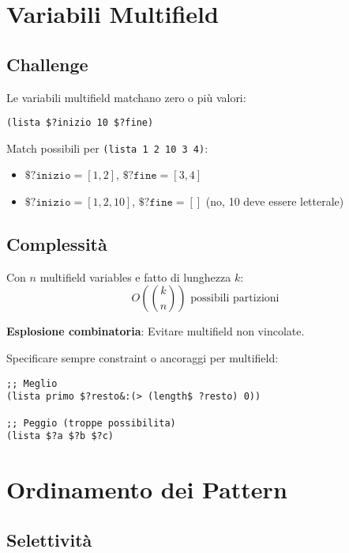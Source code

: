 \section{Variabili Multifield}

\subsection{Challenge}

Le variabili multifield matchano zero o più valori:

\begin{lstlisting}[language=CLIPS]
(lista $?inizio 10 $?fine)
\end{lstlisting}

Match possibili per \texttt{(lista 1 2 10 3 4)}:
\begin{itemize}
\item $\texttt{\$?inizio} = [1,2]$, $\texttt{\$?fine} = [3,4]$
\item $\texttt{\$?inizio} = [1,2,10]$, $\texttt{\$?fine} = []$ (no, 10 deve essere letterale)
\end{itemize}

\subsection{Complessità}

Con $n$ multifield variables e fatto di lunghezza $k$:
\begin{equation}
O\left(\binom{k}{n}\right) \text{ possibili partizioni}
\end{equation}

\textbf{Esplosione combinatoria}: Evitare multifield non vincolate.

\begin{warningbox}
Specificare sempre constraint o ancoraggi per multifield:
\begin{lstlisting}[language=CLIPS]
;; Meglio
(lista primo $?resto&:(> (length$ ?resto) 0))

;; Peggio (troppe possibilita)
(lista $?a $?b $?c)
\end{lstlisting}
\end{warningbox}

\section{Ordinamento dei Pattern}

\subsection{Selettività}

